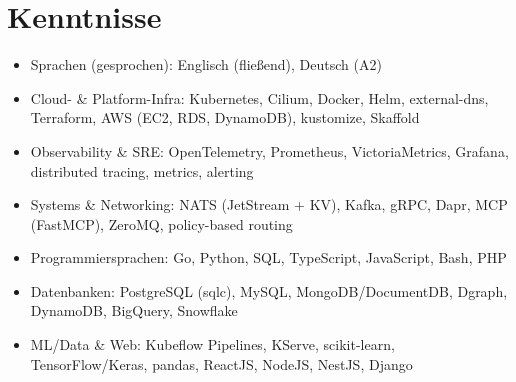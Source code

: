 \documentclass[10pt,a4paper]{resume}
\begin{document}
\section{Kenntnisse}

\begin{itemize}[leftmargin=1.4em,nosep,topsep=2pt]
  \item Sprachen (gesprochen): Englisch (fließend), Deutsch (A2)
  \item Cloud- \& Platform-Infra: Kubernetes, Cilium, Docker, Helm, external-dns, Terraform, AWS (EC2, RDS, DynamoDB), kustomize, Skaffold
  \item Observability \& SRE: OpenTelemetry, Prometheus, VictoriaMetrics, Grafana, distributed tracing, metrics, alerting
  \item Systems \& Networking: NATS (JetStream + KV), Kafka, gRPC, Dapr, MCP (FastMCP), ZeroMQ, policy-based routing
  \item Programmiersprachen: Go, Python, SQL, TypeScript, JavaScript, Bash, PHP
  \item Datenbanken: PostgreSQL (sqlc), MySQL, MongoDB/DocumentDB, Dgraph, DynamoDB, BigQuery, Snowflake
  \item ML/Data \& Web: Kubeflow Pipelines, KServe, scikit-learn, TensorFlow/Keras, pandas, ReactJS, NodeJS, NestJS, Django
\end{itemize}
\end{document}
